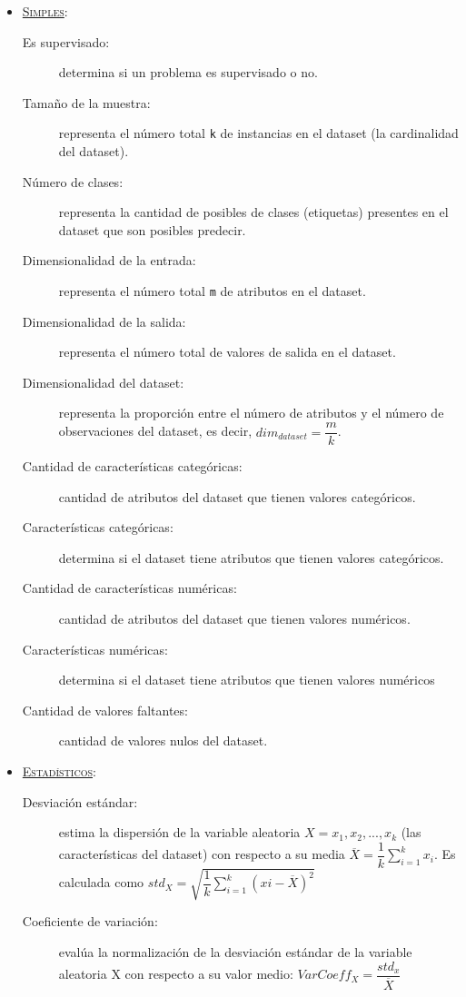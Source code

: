 \begin{itemize}
	\item \underline{\textsc{Simples}}: \begin{description}
		\item[Es supervisado:] determina si un problema es supervisado o no.
		\item[Tamaño de la muestra:] representa el número total \texttt{k} de instancias en el dataset (la cardinalidad del dataset).
		\item[Número de clases:] representa la cantidad de posibles de clases (etiquetas) presentes en el dataset que son posibles predecir.
		\item[Dimensionalidad de la entrada:] representa el número total \texttt{m} de atributos en el dataset.
		\item[Dimensionalidad de la salida:] representa el número total de valores de salida en el dataset.
		\item[Dimensionalidad del dataset:] representa la proporción entre el número de atributos y el número de observaciones del dataset, es decir, $dim_{dataset} = \dfrac{m}{k}$.
		\item[Cantidad de características categóricas:] cantidad de atributos del dataset que tienen valores categóricos.
		\item[Características categóricas:] determina si el dataset tiene atributos que tienen valores categóricos.
		\item[Cantidad de características numéricas:] cantidad de atributos del dataset que tienen valores numéricos.
		\item[Características numéricas:] determina si el dataset tiene atributos que tienen valores numéricos
		\item[Cantidad de valores faltantes:] cantidad de valores nulos del dataset.
	\end{description}
	\item \underline{\textsc{Estadísticos}}: \begin{description}
		\item[Desviación estándar:] estima la dispersión de la variable aleatoria $X = x_1, x_2, ..., x_k$ (las características del dataset) con respecto a su media $\overline{X} = \dfrac{1}{k}\sum^k_{i=1}x_i$. Es calculada como $std_X = \sqrt{\dfrac{1}{k}\sum^k_{i=1}(xi - \overline{X})^2}$
		\item[Coeficiente de variación:] evalúa la normalización de la desviación estándar de la variable aleatoria X con respecto a su valor medio: $VarCoeff_X =  \dfrac{std_x}{\overline{X}}$

\end{description}
\end{itemize}
